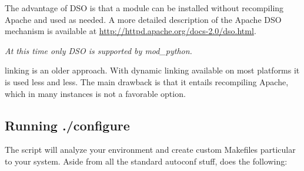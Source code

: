 The advantage of DSO is that a module can be installed without
recompiling Apache and used as needed.  A more detailed description of
the Apache DSO mechanism is available at
\url{http://httpd.apache.org/docs-2.0/dso.html}.

\emph{At this time only DSO is supported by mod_python.}

 linking is an older approach. With dynamic linking
available on most platforms it is used less and less. The main
drawback is that it entails recompiling Apache, which in many
instances is not a favorable option.

\subsection{Running ./configure\label{inst-configure}}

The  script will analyze your environment and create custom
Makefiles particular to your system. Aside from all the standard
autoconf stuff,  does the following:

